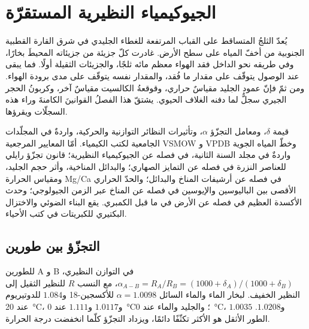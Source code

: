 \chapter{الجيوكيمياء النظيرية المستقرّة}\label{ch:b3:stable-isotopes}

يُعدّ الثلجُ المتساقط على القباب المرتفعة للغطاء الجليدي في شرق القارة القطبية الجنوبية
من أخفّ المياه على سطح الأرض. غادرت كلّ جزيئة من جزيئاته المحيطَ بخارًا،
وفي طريقه نحو الداخل فقد الهواء معظم مائه ثلجًا، والجزيئات الثقيلة
أولًا. فما يبقى عند الوصول يتوقّف على مقدار ما فُقد، والمقدار نفسه يتوقّف على
مدى برودة الهواء. ومن ثمّ فإنّ عمود الجليد مقياسٌ حراري، وقوقعةُ الكالسيت مقياسٌ آخر،
وكربونُ الحجر الجيري سجلٌّ لما دفنه
الغلاف الحيوي. يشتقّ هذا الفصلُ القوانينَ الكامنةَ وراء هذه السجلّات
ويقرؤها.

\begin{recall}
قيمة $\delta$، ومعامل التجزّؤ $\alpha$، وتأثيرات النظائر التوازنية والحركية، واردةٌ في
المجلّدات الجامعية لكتب الكيمياء. أمّا المعايير المرجعية
VSMOW و VPDB وخطّ المياه الجوية واردةٌ في
مجلد السنة الثانية، في فصله عن الجيوكيمياء النظيرية؛
قانون تجزّؤ رايلي للعناصر النزرة في فصله عن التمايز الصهاري؛
والبدائل المناخية، وأثر حجم الجليد، ومقياس الحرارة Mg/Ca
في فصله عن أرشيفات المناخ والبدائل؛ والحدّ الحراري
الأقصى بين الباليوسين والإيوسين في فصله عن المناخ عبر
الزمن الجيولوجي؛ وحدث الأكسدة العظيم في فصله عن الأرض في ما قبل الكمبري.
يقع البناء الضوئي والاختزال البكتيري للكبريتات في كتب الأحياء.
\end{recall}

\section{التجزّؤ بين طورين}\label{sec:b3:stable-isotopes:fractionation}

للطورين A و B في التوازن النظيري، $\alpha_{A-B} = R_A/R_B =
(1000 + \delta_A)/(1000 + \delta_B)$، مع النسب $R$ للنظير الثقيل إلى
النظير الخفيف. لبخار الماء والماء السائل $\alpha = 1.0098$ للأكسجين-18
و$1.084$ للدوتيريوم عند \qty{20}{\celsius}، و$1.0117$ و$1.111$ عند
\qty{0}{\celsius}؛ والجليد والماء عند \qty{0}{\celsius}، $1.0035$ و$1.0208$.
الطور الأثقل هو الأكثر تكثّفًا دائمًا، ويزداد التجزّؤ
كلّما انخفضت درجة الحرارة.

